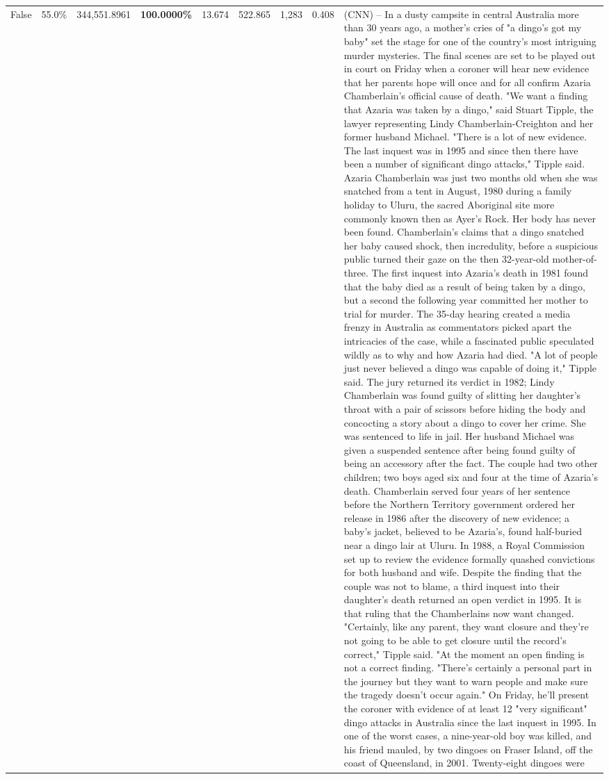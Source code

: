 \begin{table}[H]
\begin{tabular}{lllrlllll}
False & 55.0\% & 344,551.8961 & \bfseries \color{red} 100.0000\% & 13.674 & 522.865 & 1,283 & 0.408 & (CNN) -- In a dusty campsite in central Australia more than 30 years ago, a mother's cries of "a dingo's got my baby" set the stage for one of the country's most intriguing murder mysteries. The final scenes are set to be played out in court on Friday when a coroner will hear new evidence that her parents hope will once and for all confirm Azaria Chamberlain's official cause of death. "We want a finding that Azaria was taken by a dingo," said Stuart Tipple, the lawyer representing Lindy Chamberlain-Creighton and her former husband Michael. "There is a lot of new evidence. The last inquest was in 1995 and since then there have been a number of significant dingo attacks," Tipple said. Azaria Chamberlain was just two months old when she was snatched from a tent in August, 1980 during a family holiday to Uluru, the sacred Aboriginal site more commonly known then as Ayer's Rock. Her body has never been found. Chamberlain's claims that a dingo snatched her baby caused shock, then incredulity, before a suspicious public turned their gaze on the then 32-year-old mother-of-three. The first inquest into Azaria's death in 1981 found that the baby died as a result of being taken by a dingo, but a second the following year committed her mother to trial for murder. The 35-day hearing created a media frenzy in Australia as commentators picked apart the intricacies of the case, while a fascinated public speculated wildly as to why and how Azaria had died. "A lot of people just never believed a dingo was capable of doing it," Tipple said. The jury returned its verdict in 1982; Lindy Chamberlain was found guilty of slitting her daughter's throat with a pair of scissors before hiding the body and concocting a story about a dingo to cover her crime. She was sentenced to life in jail. Her husband Michael was given a suspended sentence after being found guilty of being an accessory after the fact. The couple had two other children; two boys aged six and four at the time of Azaria's death. Chamberlain served four years of her sentence before the Northern Territory government ordered her release in 1986 after the discovery of new evidence; a baby's jacket, believed to be Azaria's, found half-buried near a dingo lair at Uluru. In 1988, a Royal Commission set up to review the evidence formally quashed convictions for both husband and wife. Despite the finding that the couple was not to blame, a third inquest into their daughter's death returned an open verdict in 1995. It is that ruling that the Chamberlains now want changed. "Certainly, like any parent, they want closure and they're not going to be able to get closure until the record's correct," Tipple said. "At the moment an open finding is not a correct finding. "There's certainly a personal part in the journey but they want to warn people and make sure the tragedy doesn't occur again." On Friday, he'll present the coroner with evidence of at least 12 "very significant" dingo attacks in Australia since the last inquest in 1995. In one of the worst cases, a nine-year-old boy was killed, and his friend mauled, by two dingoes on Fraser Island, off the coast of Queensland, in 2001. Twenty-eight dingoes were 
\end{tabular}
\end{table}
